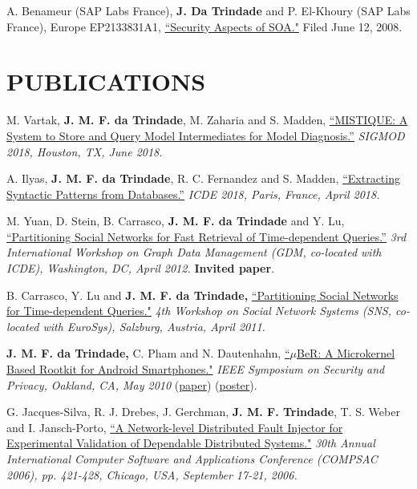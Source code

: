 \documentclass[line,margin]{res}
\begin{document}
\begin{resume}
A. Benameur (SAP Labs France), \textbf{J. Da Trindade} and P. El-Khoury (SAP Labs France), Europe EP2133831A1, \href{http://www.freepatentsonline.com/EP2133831B1.html}{``Security Aspects of SOA."}  Filed June 12, 2008.

\section{PUBLICATIONS}
M. Vartak, \textbf{J. M. F. da Trindade}, M. Zaharia and S. Madden, \href{https://cs.stanford.edu/~matei/papers/2018/sigmod_mistique.pdf}{``MISTIQUE: A System to Store and Query Model Intermediates for Model Diagnosis.''} \textit{SIGMOD 2018, Houston, TX, June 2018.}

A. Ilyas, \textbf{J. M. F. da Trindade}, R. C. Fernandez and S. Madden, \href{https://arxiv.org/pdf/1710.11528.pdf}{``Extracting Syntactic Patterns from Databases.''} \textit{ICDE 2018, Paris, France, April 2018.}

M. Yuan, D. Stein, B. Carrasco, \textbf{J. M. F. da Trindade} and Y. Lu, \href{http://joanatrindade.wdfiles.com/local--files/curriculum/gdm2012-paper.pdf}{``Partitioning Social Networks for Fast Retrieval of Time-dependent Queries.''} \textit{3rd International Workshop on Graph Data Management (GDM, co-located with ICDE), Washington, DC, April 2012.} \textbf{Invited paper}.

B. Carrasco, Y. Lu and \textbf{J. M. F. da Trindade,} \href{http://research.microsoft.com/en-us/projects/ldg/a04-carrasco.pdf}{``Partitioning Social Networks for Time-dependent Queries."} \textit{4th Workshop on Social Network Systems (SNS, co-located with EuroSys), Salzburg, Austria, April 2011.}

\textbf{J. M. F. da Trindade,} C. Pham and N. Dautenhahn, \href{http://joanatrindade.wikidot.com/local--files/curriculum/oakland2010-paper.pdf}{``$\mu$BeR: A Microkernel Based Rootkit for Android Smartphones."} \textit{IEEE Symposium on Security and Privacy, Oakland, CA, May 2010} (\href{http://joanatrindade.wikidot.com/local--files/curriculum/oakland2010-paper.pdf}{paper}) (\href{http://joanatrindade.wikidot.com/local--files/curriculum/oakland2010-poster.pdf}{poster}).

G. Jacques-Silva, R. J. Drebes, J. Gerchman, \textbf{J. M. F. Trindade}, T. S. Weber and I. Jansch-Porto, \href{http://doi.ieeecomputersociety.org/10.1109/COMPSAC.2006.12}{``A Network-level Distributed Fault Injector for Experimental Validation of Dependable Distributed Systems."} \textit{30th Annual International Computer Software and Applications Conference (COMPSAC 2006), pp. 421-428, Chicago, USA, September 17-21, 2006.}


\end{resume}
\end{document}
